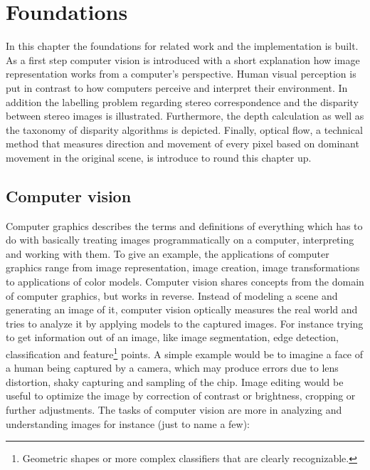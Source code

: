 \chapter{Foundations}
\label{chap:foundations}

In this chapter the foundations for related work and the implementation is built.
As a first step computer vision is introduced with a short explanation how image representation works from a computer's perspective.
Human visual perception is put in contrast to how computers perceive and interpret their environment.
In addition the labelling problem regarding stereo correspondence and the disparity between stereo images is illustrated.
Furthermore, the depth calculation as well as the taxonomy of disparity algorithms is depicted.
Finally, optical flow, a technical method that measures direction and movement of every pixel based on dominant movement in the original scene, is introduce to round this chapter up.

\section{Computer vision}

Computer graphics describes the terms and definitions of everything which has to do with basically treating images programmatically on a computer, interpreting and working with them.
To give an example, the applications of computer graphics range from image representation, image creation, image transformations to applications of color models.
Computer vision shares concepts from the domain of computer graphics, but works in reverse.
Instead of modeling a scene and generating an image of it, computer vision optically measures the real world and tries to analyze it by applying models to the captured images.
For instance trying to get information out of an image, like image segmentation, edge detection, classification and feature\footnote{Geometric shapes or more complex classifiers that are clearly recognizable.} points.
\newline\newline\noindent A simple example would be to imagine a face of a human being captured by a camera, which may produce errors due to lens distortion, shaky capturing and sampling of the chip.
Image editing would be useful to optimize the image by correction of contrast or brightness, cropping or further adjustments.
The tasks of computer vision are more in analyzing and understanding images for instance (just to name a few):

